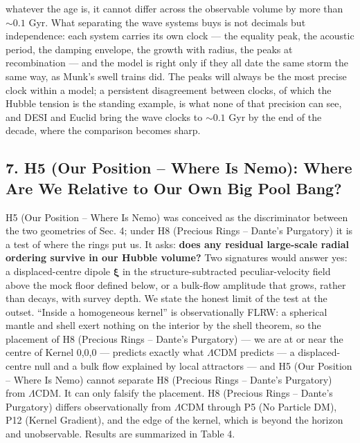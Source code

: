 \documentclass[
  11pt,
]{article}
\begin{document}
whatever the age is, it cannot differ across the observable volume by
more than \(\sim 0.1\) Gyr. What separating the wave systems buys is not
decimals but independence: each system carries its own clock --- the
equality peak, the acoustic period, the damping envelope, the growth
with radius, the peaks at recombination --- and the model is right only
if they all date the same storm the same way, as Munk's swell trains
did. The peaks will always be the most precise clock within a model; a
persistent disagreement between clocks, of which the Hubble tension is
the standing example, is what none of that precision can see, and DESI
and Euclid bring the wave clocks to \(\sim 0.1\) Gyr by the end of the
decade, where the comparison becomes sharp.

\hypertarget{h5-our-position-where-is-nemo-where-are-we-relative-to-our-own-big-pool-bang}{%
\subsection{\texorpdfstring{\textbf{7. H5 (Our Position -- Where Is
Nemo): Where Are We Relative to Our Own Big Pool
Bang?}}{7. H5 (Our Position -- Where Is Nemo): Where Are We Relative to Our Own Big Pool Bang?}}\label{h5-our-position-where-is-nemo-where-are-we-relative-to-our-own-big-pool-bang}}

H5 (Our Position -- Where Is Nemo) was conceived as the discriminator
between the two geometries of Sec. 4; under H8 (Precious Rings --
Dante's Purgatory) it is a test of where the rings put us. It asks:
\textbf{does any residual large-scale radial ordering survive in our
Hubble volume?} Two signatures would answer yes: a displaced-centre
dipole \(\boldsymbol{\xi}\) in the structure-subtracted
peculiar-velocity field above the mock floor defined below, or a
bulk-flow amplitude that grows, rather than decays, with survey depth.
We state the honest limit of the test at the outset. ``Inside a
homogeneous kernel'' is observationally FLRW: a spherical mantle and
shell exert nothing on the interior by the shell theorem, so the
placement of H8 (Precious Rings -- Dante's Purgatory) --- we are at or
near the centre of Kernel 0,0,0 --- predicts exactly what \(\Lambda\)CDM
predicts --- a displaced-centre null and a bulk flow explained by local
attractors --- and H5 (Our Position -- Where Is Nemo) cannot separate H8
(Precious Rings -- Dante's Purgatory) from \(\Lambda\)CDM. It can only
falsify the placement. H8 (Precious Rings -- Dante's Purgatory) differs
observationally from \(\Lambda\)CDM through P5 (No Particle DM), P12
(Kernel Gradient), and the edge of the kernel, which is beyond the
horizon and unobservable. Results are summarized in Table 4.
\end{document}
